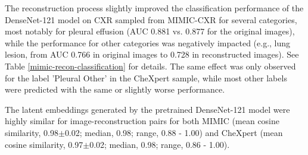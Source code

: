\documentclass{article}
\begin{document}
The reconstruction process slightly improved the classification performance of the DenseNet-121 model on CXR sampled from MIMIC-CXR for several categories, most notably for pleural effusion (AUC 0.881 vs. 0.877 for the original images), while the performance for other categories was negatively impacted (e.g., lung lesion, from AUC 0.766 in original images to 0.728 in reconstructed images). See Table \ref{mimic-recon-classification} for details. The same effect was 
only observed for the label 'Pleural Other' in the CheXpert sample, while most other labels were predicted with the same or slightly worse performance. 

The latent embeddings generated by the pretrained DenseNet-121 model were highly similar for image-reconstruction pairs for both MIMIC (mean cosine similarity, 0.98$\pm$0.02; median, 0.98; range, 0.88 - 1.00) and CheXpert (mean cosine similarity, 0.97$\pm$0.02; median, 0.98; range, 0.86 - 1.00).
\end{document}
